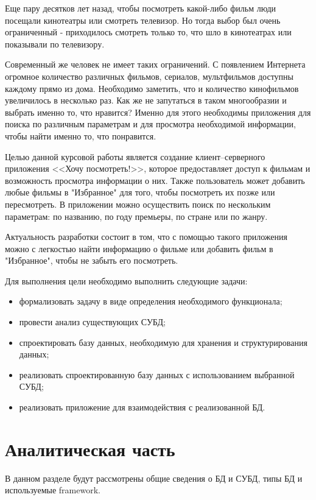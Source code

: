 \documentclass[12pt]{article}
\begin{document}
Еще пару десятков лет назад, чтобы посмотреть какой-либо фильм люди посещали кинотеатры или смотреть телевизор. Но тогда выбор был очень ограниченный - приходилось смотреть только то, что шло в кинотеатрах или показывали по телевизору.

Современный же человек не имеет таких ограничений. С появлением Интернета огромное количество различных фильмов, сериалов, мультфильмов доступны каждому прямо из дома. Необходимо заметить, что и количество кинофильмов увеличилось в несколько раз. Как же не запутаться в таком многообразии и выбрать именно то, что нравится? Именно для этого необходимы приложения для поиска по различным параметрам и для просмотра необходимой информации, чтобы найти именно то, что понравится.
\hfill \break

Целью данной курсовой работы является создание клиент–серверного приложения <<Хочу посмотреть!>>, которое предоставляет доступ к фильмам и возможность просмотра информации о них. Также пользователь может добавить любые фильмы в "Избранное" для того, чтобы посмотреть их позже или пересмотреть. В приложении можно осуществить поиск по нескольким параметрам: по названию, по году премьеры, по стране или по жанру.

Актуальность разработки состоит в том, что с помощью такого приложения можно с легкостью найти информацию о фильме или добавить фильм в "Избранное", чтобы не забыть его посмотреть.

Для выполнения цели необходимо выполнить следующие задачи:
\begin{itemize}
	\item формализовать задачу в виде определения необходимого функционала;
	\item провести анализ существующих СУБД;
	\item спроектировать базу данных, необходимую для хранения и структурирования данных;
	\item реализовать спроектированную базу данных с использованием выбранной СУБД;
	\item реализовать приложение для взаимодействия с реализованной БД.
\end{itemize}

\newpage
\section{Аналитическая часть}%
\setcounter{section}{1}

В данном разделе будут рассмотрены общие сведения о БД и СУБД, типы БД и используемые framework. 
\end{document}
